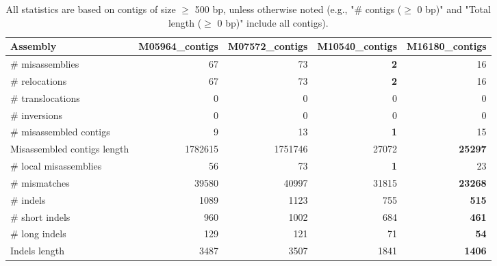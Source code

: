 \documentclass[12pt,a4paper]{article}
\begin{document}
\begin{table}[ht]
\begin{center}
\caption{All statistics are based on contigs of size $\geq$ 500 bp, unless otherwise noted (e.g., "\# contigs ($\geq$ 0 bp)" and "Total length ($\geq$ 0 bp)" include all contigs).}
\begin{tabular}{|l*{4}{|r}|}
\hline
Assembly & M05964\_contigs & M07572\_contigs & M10540\_contigs & M16180\_contigs \\ \hline
\# misassemblies & 67 & 73 & {\bf 2} & 16 \\ \hline
\hspace{5mm}\# relocations & 67 & 73 & {\bf 2} & 16 \\ \hline
\hspace{5mm}\# translocations & 0 & 0 & 0 & 0 \\ \hline
\hspace{5mm}\# inversions & 0 & 0 & 0 & 0 \\ \hline
\# misassembled contigs & 9 & 13 & {\bf 1} & 15 \\ \hline
Misassembled contigs length & 1782615 & 1751746 & 27072 & {\bf 25297} \\ \hline
\# local misassemblies & 56 & 73 & {\bf 1} & 23 \\ \hline
\# mismatches & 39580 & 40997 & 31815 & {\bf 23268} \\ \hline
\# indels & 1089 & 1123 & 755 & {\bf 515} \\ \hline
\hspace{5mm}\# short indels & 960 & 1002 & 684 & {\bf 461} \\ \hline
\hspace{5mm}\# long indels & 129 & 121 & 71 & {\bf 54} \\ \hline
Indels length & 3487 & 3507 & 1841 & {\bf 1406} \\ \hline
\end{tabular}
\end{center}
\end{table}
\end{document}
